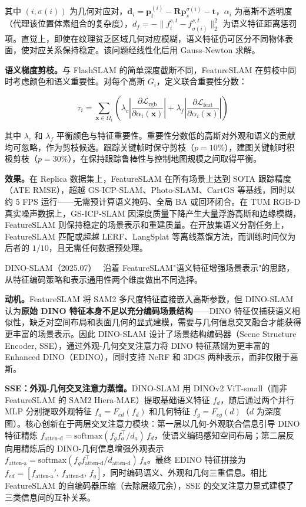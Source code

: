其中 $(i, \sigma(i))$ 为几何对应对，$\mathbf{d}_i = \mathbf{p}_t^{(i)} - \mathbf{R}\mathbf{p}_s^{\sigma(i)} - \mathbf{t}$，$\alpha_i$ 为高斯不透明度（代理该位置体素组合的复杂度），$d_f = -\|f_i^{s,t} - f_{\sigma(i)}^{s,t}\|_2^2$ 为语义特征距离惩罚项。直觉上，即使在纹理贫乏区域几何对应模糊，语义特征仍可区分不同物体表面，使对应关系保持稳定。该问题经线性化后用 Gauss-Newton 求解。

\textbf{语义梯度剪枝。}与 FlashSLAM 的简单深度截断不同，FeatureSLAM 在剪枝中同时考虑颜色和语义重要性。对每个高斯 $G_i$，定义联合重要性分数：

\begin{equation}
    \tau_i = \sum_{\mathbf{x} \in \Omega_i} \left( \lambda_c \left| \frac{\partial \mathcal{L}_\text{rgb}}{\partial \alpha_i(\mathbf{x})} \right| + \lambda_f \left| \frac{\partial \mathcal{L}_\text{feat}}{\partial \alpha_i(\mathbf{x})} \right| \right)
\end{equation}

其中 $\lambda_c$ 和 $\lambda_f$ 平衡颜色与特征重要性。重要性分数低的高斯对外观和语义的贡献均可忽略，作为剪枝候选。跟踪关键帧时保守剪枝（$p=10\%$），建图关键帧时积极剪枝（$p=30\%$），在保持跟踪鲁棒性与控制地图规模之间取得平衡。

\textbf{效果。}在 Replica 数据集上，FeatureSLAM 在所有场景上达到 SOTA 跟踪精度（ATE RMSE），超越 GS-ICP-SLAM、Photo-SLAM、CartGS 等基线，同时以约 5 FPS 运行——无需预计算语义掩码、全局 BA 或回环闭合。在 TUM RGB-D 真实噪声数据上，GS-ICP-SLAM 因深度质量下降产生大量浮游高斯和边缘模糊，FeatureSLAM 则保持稳定的场景表示和重建质量。在开放集语义分割任务上，FeatureSLAM 匹配或超越 LERF、LangSplat 等离线蒸馏方法，而训练时间仅为后者的 $1/10$，且无需任何数据预处理。

DINO-SLAM（2025.07）~\cite{2507_19474} 沿着 FeatureSLAM"语义特征增强场景表示"的思路，从特征编码策略和表示通用性两个维度做出不同选择。

\textbf{动机。}FeatureSLAM 将 SAM2 多尺度特征直接嵌入高斯参数，但 DINO-SLAM 认为\textbf{原始 DINO 特征本身不足以充分编码场景结构}——DINO 特征仅捕获语义相似性，缺乏对空间布局和表面几何的显式建模，需要与几何信息交叉融合才能获得更丰富的场景表示。因此 DINO-SLAM 设计了场景结构编码器（Scene Structure Encoder, SSE），通过外观-几何交叉注意力将 DINO 特征蒸馏为更丰富的 Enhanced DINO（EDINO），同时支持 NeRF 和 3DGS 两种表示，而非仅限于高斯。

\textbf{SSE：外观-几何交叉注意力蒸馏。}DINO-SLAM 用 DINOv2 ViT-small（而非 FeatureSLAM 的 SAM2 Hiera-MAE）提取基础语义特征 $f_d$，随后通过两个并行 MLP 分别提取外观特征 $f_a = F_{ed}(f_d)$ 和几何特征 $f_g = F_{eg}(d)$（$d$ 为深度图）。核心创新在于两层交叉注意力模块：第一层以几何-外观联合信息引导 DINO 特征精炼 $f_{\text{atten-d}} = \text{softmax}(f_g f_a^\top / d_a)\,f_d$，使语义编码感知空间布局；第二层反向用精炼后的 DINO-几何信息增强外观表示 $f_{\text{atten-a}} = \text{softmax}(f_g f_{\text{atten-d}}^\top / d_{\text{atten-d}})\,f_a$。最终 EDINO 特征拼接为 $f_{ed} = [f_{\text{atten-a}}',\, f_{\text{atten-d}},\, f_g]$，同时编码语义、外观和几何三重信息。相比 FeatureSLAM 的自编码器压缩（去除层级冗余），SSE 的交叉注意力显式建模了三类信息间的互补关系。

